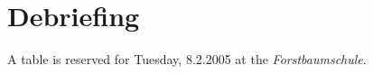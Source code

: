 \documentclass[11pt]{article}
\begin{document}




%

%


\section*{Debriefing}

A table is reserved for Tuesday, 8.2.2005 at the \emph{Forstbaumschule}.







%
%
\end{document}
